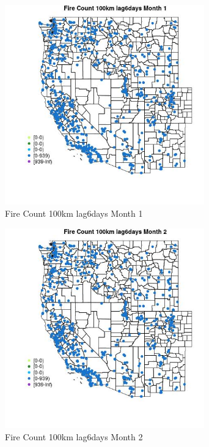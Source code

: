 \begin{figure} 
\centering  
\includegraphics[width=0.77\textwidth]{Code_Outputs/Report_ML_input_PM25_Step4_part_e_de_duplicated_aves_compiled_2019-05-21wNAs_MapObsMo1Fire_Count_100km_lag6days.jpg} 
\caption{\label{fig:Report_ML_input_PM25_Step4_part_e_de_duplicated_aves_compiled_2019-05-21wNAsMapObsMo1Fire_Count_100km_lag6days}Fire Count 100km lag6days Month 1} 
\end{figure} 
 

\begin{figure} 
\centering  
\includegraphics[width=0.77\textwidth]{Code_Outputs/Report_ML_input_PM25_Step4_part_e_de_duplicated_aves_compiled_2019-05-21wNAs_MapObsMo2Fire_Count_100km_lag6days.jpg} 
\caption{\label{fig:Report_ML_input_PM25_Step4_part_e_de_duplicated_aves_compiled_2019-05-21wNAsMapObsMo2Fire_Count_100km_lag6days}Fire Count 100km lag6days Month 2} 
\end{figure} 
 

